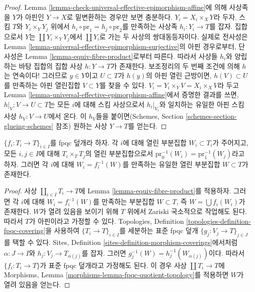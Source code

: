 \begin{proof}
Lemma \ref{lemma-check-universal-effective-epimorphism-affine}에 의해 사상족을
$Y$가 아핀인 $Y \to X$로 밑변환하는 경우만 보면 충분하다.
$Y_i = X_i \times_X Y$라 두자. 스킴 $T$와
$Y_i \times_Y Y_j$ 위에서 $h_i \circ \text{pr}_1 = h_j \circ \text{pr}_2$를
만족하는 사상족 $h_i : Y_i \to T$를 잡자. 집합으로서 $Y$는
$\coprod Y_i \times_Y Y_j$에서 $\coprod Y_i$로 가는 두 사상의
쌍대동등자이다. 실제로 전사성은 Lemma
\ref{lemma-universal-effective-epimorphism-surjective}의 아핀 경우로부터,
단사성은 Lemma \ref{lemma-equiv-fibre-product}로부터 따른다.
따라서 사상들 $h_i$와 양립하는 바탕 집합의 집합 사상 $h : Y \to T$가
존재한다. 보조정리의 두 번째 조건에 의해 $h$는 연속이다!
그러므로 $y \in Y$이고 $U \subset T$가 $h(y)$의 아핀 열린 근방이면,
$h(V) \subset U$를 만족하는 아핀 열린집합 $V \subset Y$를 찾을 수 있다.
$V_i = Y_i \times_Y V = X_i \times_X V$라 두고 Lemma
\ref{lemma-universal-effective-epimorphism-affine}에서 증명한 결과를 쓰면,
$h|_V : V \to U \subset T$는 모든 $i$에 대해 스킴 사상으로서
$h_i|_{V_i}$와 일치하는 유일한 아핀 스킴 사상 $h_V : V \to U$에서
온다. 이 $h_V$들을 붙이면(Schemes, Section
\ref{schemes-section-glueing-schemes} 참조) 원하는 사상 $Y \to T$를 얻는다.
\end{proof}

\begin{lemma}
\label{lemma-open-fpqc-covering}
$\{f_i : T_i \to T\}_{i \in I}$를 fpqc 덮개라 하자. 각 $i$에 대해
열린 부분집합 $W_i \subset T_i$가 주어지고, 모든 $i, j \in I$에 대해
$T_i \times_T T_j$의 열린 부분집합으로서
$\text{pr}_0^{-1}(W_i) = \text{pr}_1^{-1}(W_j)$라고 하자. 그러면 각 $i$에
대해 $W_i = f_i^{-1}(W)$를 만족하는 유일한 열린 부분집합 $W \subset T$가
존재한다.
\end{lemma}

\begin{proof}
사상 $\coprod_{i \in I} T_i \to T$에 Lemma
\ref{lemma-equiv-fibre-product}를 적용하자. 그러면 각 $i$에 대해
$W_i = f_i^{-1}(W)$를 만족하는 부분집합 $W \subset T$, 즉
$W = \bigcup f_i(W_i)$가 존재한다. $W$가 열려 있음을 보이기 위해
$T$ 위에서 Zariski 국소적으로 작업해도 된다. 따라서 $T$가 아핀이라고
가정할 수 있다. Topologies, Definition
\ref{topologies-definition-fpqc-covering}을 사용하여
$\{T_i \to T\}_{i \in I}$를 세분하는 표준 fpqc 덮개
$\{g_j : V_j \to T\}_{j \in J}$를 택할 수 있다. Sites, Definition
\ref{sites-definition-morphism-coverings}에서처럼 $\alpha : J \to I$와
$h_j : V_j \to T_{\alpha(j)}$를 잡자. 그러면
$g_j^{-1}(W) = h_j^{-1}(W_{\alpha(j)})$이다. 따라서
$\{f_i : T_i \to T\}$가 표준 fpqc 덮개라고 가정해도 된다. 이 경우 사상
$\coprod T_i \to T$에 Morphisms, Lemma
\ref{morphisms-lemma-fpqc-quotient-topology}를 적용하면 $W$가 열려 있음을
얻는다.
\end{proof}

